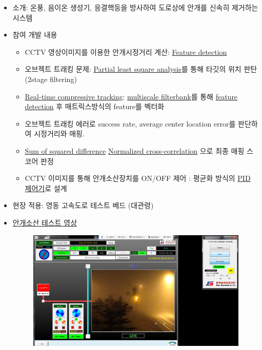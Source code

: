 
\begin{itemize}[label=]
	\item 소개: 온풍, 음이온 생성기, 응결핵등을 방사하여 도로상에 안개를 신속히 제거하는 시스템
	\item 참여 개발 내용
	      \begin{itemize}[label=]
		      \item CCTV 영상이미지를 이용한 안개시정거리 계산: \href{https://en.wikipedia.org/wiki/Feature_detection_(computer_vision)}{Feature detection}
		      \item 오브젝트 트래킹 문제: \href{https://en.wikipedia.org/wiki/Partial_least_squares_regression}{Partial least square analysis}를 통해 타깃의 위치 판탄 (2stage filtering)
		      \item \href{http://www4.comp.polyu.edu.hk/~cslzhang/CT/CT.htm}{Real-time compressive tracking}: \href{https://en.wikipedia.org/wiki/Filter_bank}{multiscale filterbank}를 통해 \href{https://en.wikipedia.org/wiki/Feature_detection_(computer_vision)}{feature detection} 후 매트릭스방식의 feature를 벡터화
		      \item 오브젝트 트래킹 에러로 success rate, average center location error를 판단하여 시정거리와 매핑.
		      \item \href{https://siddhantahuja.wordpress.com/tag/sum-of-squared-differences/}{Sum of squared difference} \/ \href{https://en.wikipedia.org/wiki/Cross-correlation\#Normalized_cross-correlation}{Normalized cross-correlation} 으로 최종 매핑 스코어 판정
		      \item CCTV 이미지를 통해 안개소산장치를 ON/OFF 제어 : 평균화 방식의 \href{https://en.wikipedia.org/wiki/PID_controller}{PID 제어기}로 설계
	      \end{itemize}
	\item 현장 적용: 영동 고속도로 테스트 베드 (대관령)
	\item \href{https://www.youtube.com/watch?v=BRl7tuJ6duY}{안개소산 테스트 영상}
	      \begin{figure}[!ht]
		      \begin{fullwidth}
			      \centering
			      \parbox{1.2\textwidth}{
				      \includegraphics[width=1.2\textwidth]{images/fog_02_01.png}
}
\end{fullwidth}
\end{figure}
\end{itemize}

